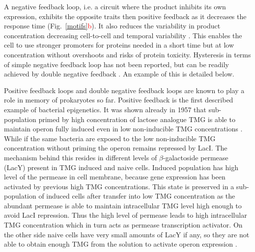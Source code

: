 A negative feedback loop, i.e. a circuit where the product inhibits its own expression, exhibits the opposite traits then positive feedback as it decreases the response time \cite{rosenfeld2002negative} (Fig.~\ref{motifs}\textcolor{red}{b}).
It also reduces the variability in product concentration decreasing cell-to-cell and temporal variability \cite{becskei2000engineering}.
This enables the cell to use stronger promoters for proteins needed in a short time but at low concentration without overshoots and risks of protein toxicity.
Hysteresis in terms of simple negative feedback loop has not been reported, but can be readily achieved by double negative feedback \cite{toman1985system}.
An example of this is detailed below.

Positive feedback loops and double negative feedback loops are known to play a role in memory of prokaryotes so far.
Positive feedback is the first described example of bacterial epigenetics.
It was shown already in 1957 that  sub-population primed by high concentration of lactose analogue TMG is able to maintain  operon fully induced even in low non-inducible TMG concentrations \cite{novick1957enzyme}.
While if the same bacteria are exposed to the low non-inducible TMG concentration without priming the  operon remains repressed by LacI.
The mechanism behind this resides in different levels of $\beta$-galactoside permease (LacY) present in TMG induced and naive cells.
Induced population has high level of the permease in cell membrane, because  gene expression has been activated by previous high TMG concentrations.
This state is preserved in a sub-population of induced cells after transfer into low TMG concentration as the abundant permease is able to maintain intracellular TMG level high enough to avoid LacI repression.
Thus the high level of permease leads to high intracellular TMG concentration which in turn acts as permease transcription activator.
On the other side naive cells have very small amounts of LacY if any, so they are not able to obtain enough TMG from the solution to activate  operon expression \cite{smits2006phenotypic, casadesus2013programmed}.

